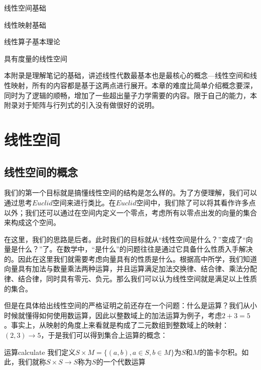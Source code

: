 \begin{introduction}
    \item 线性空间基础
    \item 线性映射基础
    \item 线性算子基本理论
    \item 具有度量的线性空间
\end{introduction}
本附录是理解笔记的基础，讲述线性代数最基本也是最核心的概念---线性空间和线性映射，所有的内容都是基于这两点进行展开。本章的难度比简单介绍概念要深，同时为了逻辑的顺畅，增加了一些超出量子力学需要的内容。限于自己的能力，本附录对于矩阵与行列式的引入没有做很好的说明。
\section{线性空间}
    \subsection{线性空间的概念}
    我们的第一个目标就是搞懂线性空间的结构是怎么样的。为了方便理解，我们可以通过思考$Euclid$空间来进行类比。在$Euclid$空间中，我们除了可以将其看作许多点以外；我们还可以通过在空间内定义一个零点，考虑所有以零点出发的向量的集合来构成这个空间。
    
    在这里，我们的思路是后者。此时我们的目标就从“线性空间是什么？”变成了“向量是什么？”了。在数学中，“是什么”的问题往往是通过它具备什么性质入手解决的。因此在这里我们就需要考虑向量具有的性质是什么。根据高中所学，我们知道向量具有加法与数量乘法两种运算，并且运算满足加法交换律、结合律、乘法分配律、结合律，同时具有零元、负元。那么我们可以认为线性空间就是满足以上性质的集合。
    
    但是在具体给出线性空间的严格证明之前还存在一个问题：什么是运算？我们从小时候就懂得如何使用数运算，因此以整数域上的加法运算为例子，考虑$2+3=5$。事实上，从映射的角度上来看就是构成了二元数组到整数域上的映射：$(2,3)\rightarrow5$，于是我们可以得到集合上运算的概念：
    \begin{definition}{运算}{calculate}
       我们定义$ S\times M=\{ (a,b),a\in S,b\in M \}$为$S$和$M$的笛卡尔积。如此，我们就称$S\times S\rightarrow S$称为$S$的一个代数运算
    \end{definition}
    
